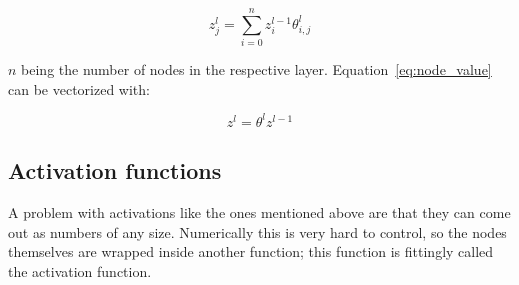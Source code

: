 \begin{equation}
    z^l_j = \sum^n_{i=0}z^{l-1}_i\theta^l_{i, j}
    \label{eq:node_value}
\end{equation}

$n$ being the number of nodes in the respective layer. Equation~\eqref{eq:node_value} can be vectorized with:

\begin{equation}
    z^l = \theta^l z^{l-1}
    \label{eq:node_value_vectorized}
\end{equation}

\subsection{Activation functions}

A problem with activations like the ones mentioned above are that they can come out as numbers of any size. Numerically this is very hard to control, so the nodes themselves are wrapped inside another function; this function is fittingly called the activation function.

